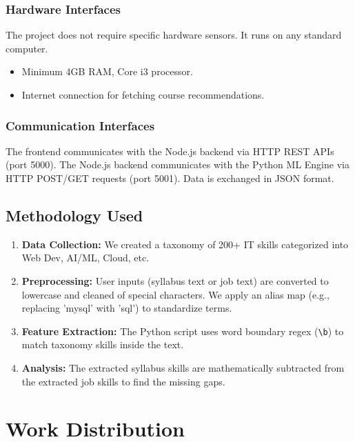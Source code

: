 \documentclass[12pt,a4paper]{report}
\begin{document}
\subsection{Hardware Interfaces}
The project does not require specific hardware sensors. It runs on any standard computer.
\begin{itemize}
    \item Minimum 4GB RAM, Core i3 processor.
    \item Internet connection for fetching course recommendations.
\end{itemize}

\subsection{Communication Interfaces}
The frontend communicates with the Node.js backend via HTTP REST APIs (port 5000). The Node.js backend communicates with the Python ML Engine via HTTP POST/GET requests (port 5001). Data is exchanged in JSON format.

\section{Methodology Used}
\begin{enumerate}
    \item \textbf{Data Collection:} We created a taxonomy of 200+ IT skills categorized into Web Dev, AI/ML, Cloud, etc.
    \item \textbf{Preprocessing:} User inputs (syllabus text or job text) are converted to lowercase and cleaned of special characters. We apply an alias map (e.g., replacing 'mysql' with 'sql') to standardize terms.
    \item \textbf{Feature Extraction:} The Python script uses word boundary regex (\verb|\b|) to match taxonomy skills inside the text.
    \item \textbf{Analysis:} The extracted syllabus skills are mathematically subtracted from the extracted job skills to find the missing gaps.
\end{enumerate}

\chapter{Work Distribution}
\end{document}
